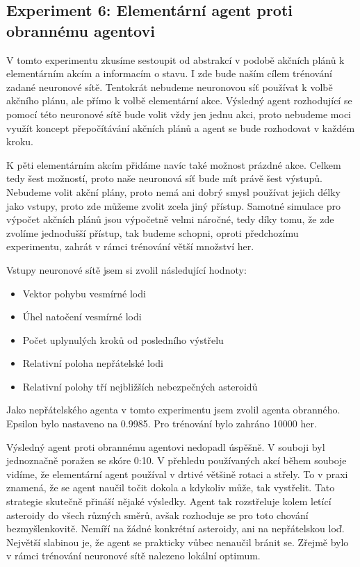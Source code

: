 \subsection{Experiment 6: Elementární agent proti obrannému agentovi}
V tomto experimentu zkusíme sestoupit od abstrakcí v podobě akčních plánů k elementárním akcím a informacím o stavu.
I zde bude naším cílem trénování zadané neuronové sítě.
Tentokrát nebudeme neuronovou síť používat k volbě akčního plánu, ale přímo k volbě elementární akce.
Výsledný agent rozhodující se pomocí této neuronové sítě bude volit vždy jen jednu akci, proto nebudeme moci využít koncept přepočítávání akčních plánů a agent se bude rozhodovat v každém kroku.

\par
K pěti elementárním akcím přidáme navíc také možnost prázdné akce. Celkem tedy šest možností, proto naše neuronová síť bude mít právě šest výstupů.
Nebudeme volit akční plány, proto nemá ani dobrý smysl používat jejich délky jako vstupy, proto zde můžeme zvolit zcela jiný přístup.
Samotné simulace pro výpočet akčních plánů jsou výpočetně velmi náročné, tedy díky tomu, že zde zvolíme jednodušší přístup, tak budeme schopni, oproti předchozímu experimentu, zahrát v rámci trénování větší množství her.

\par
Vstupy neuronové sítě jsem si zvolil následující hodnoty:
\begin{itemize}
    \item Vektor pohybu vesmírné lodi
    \item Úhel natočení vesmírné lodi
    \item Počet uplynulých kroků od posledního výstřelu
    \item Relativní poloha nepřátelské lodi
    \item Relativní polohy tří nejbližších nebezpečných asteroidů
\end{itemize}

Jako nepřátelského agenta v tomto experimentu jsem zvolil agenta obranného.
Epsilon bylo nastaveno na 0.9985. Pro trénování bylo zahráno 10000 her.




Výsledný agent proti obrannému agentovi nedopadl úspěšně. V souboji byl jednoznačně poražen se skóre 0:10.
V přehledu používaných akcí během souboje vidíme, že elementární agent používal v drtivé většině rotaci a střely.
To v praxi znamená, že se agent naučil točit dokola a kdykoliv může, tak vystřelit. Tato strategie skutečně přináší nějaké výsledky.
Agent tak rozstřeluje kolem letící asteroidy do všech různých směrů, avšak rozhoduje se pro toto chování bezmyšlenkovitě. Nemíří na žádné konkrétní asteroidy, ani na nepřátelskou loď.
Největší slabinou je, že agent se prakticky vůbec nenaučil bránit se. Zřejmě bylo v rámci trénování neuronové sítě nalezeno lokální optimum.

